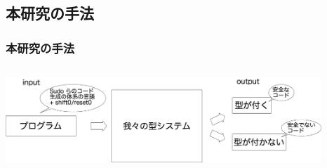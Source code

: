 \documentclass[dvipdfmx,cjk,xcolor=dvipsnames,envcountsect,notheorems,12pt]{beamer}
\theoremstyle{definition}
\begin{document}


\subsection{本研究の手法}
\begin{frame}
  \frametitle{本研究の手法}
  \begin{columns}
    \begin{column}{1.\textwidth}%
      \center
      \includegraphics[clip,height=3.2cm]{../img/code_s0r0.png}
    \end{column}
  \end{columns}
\end{frame}
\end{document}

